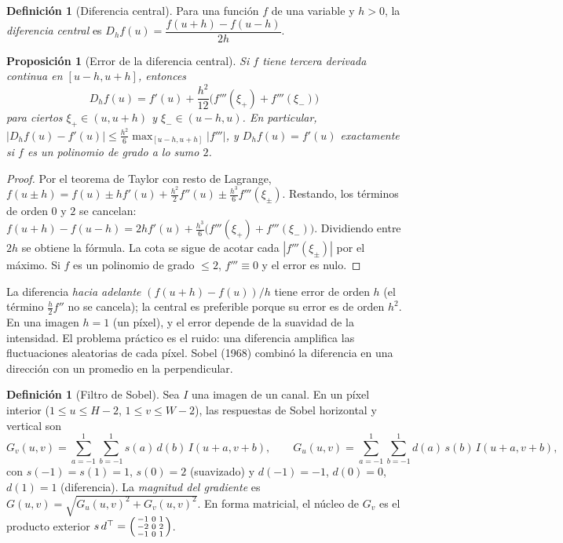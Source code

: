 \documentclass[11pt]{article}
\newtheorem{proposicion}[teorema]{Proposición}
\theoremstyle{definition}
\newtheorem{definicion}[teorema]{Definición}
\theoremstyle{remark}
\newcommand{\abs}[1]{\left\lvert #1\right\rvert}
\begin{document}
\begin{definicion}[Diferencia central]\label{def:dif-central}
\noindent Para una función $f$ de una variable y $h>0$, la \emph{diferencia central} es $D_hf(u)=\dfrac{f(u+h)-f(u-h)}{2h}$.
\end{definicion}

\begin{proposicion}[Error de la diferencia central]\label{prop:dif-central}
\noindent Si $f$ tiene tercera derivada continua en $[u-h,u+h]$, entonces
\[
D_hf(u)=f'(u)+\frac{h^2}{12}\big(f'''(\xi_+)+f'''(\xi_-)\big)
\]
para ciertos $\xi_+\in(u,u+h)$ y $\xi_-\in(u-h,u)$. En particular, $\abs{D_hf(u)-f'(u)}\le\frac{h^2}{6}\max_{[u-h,u+h]}\abs{f'''}$, y $D_hf(u)=f'(u)$ exactamente si $f$ es un polinomio de grado a lo sumo $2$.
\end{proposicion}
\begin{proof}
\noindent Por el teorema de Taylor con resto de Lagrange, $f(u\pm h)=f(u)\pm hf'(u)+\frac{h^2}2f''(u)\pm\frac{h^3}6f'''(\xi_\pm)$. Restando, los términos de orden $0$ y $2$ se cancelan: $f(u+h)-f(u-h)=2hf'(u)+\frac{h^3}{6}\big(f'''(\xi_+)+f'''(\xi_-)\big)$. Dividiendo entre $2h$ se obtiene la fórmula. La cota se sigue de acotar cada $\abs{f'''(\xi_\pm)}$ por el máximo. Si $f$ es un polinomio de grado $\le2$, $f'''\equiv0$ y el error es nulo.
\end{proof}

\noindent La diferencia \emph{hacia adelante} $(f(u+h)-f(u))/h$ tiene error de orden $h$ (el término $\frac h2f''$ no se cancela); la central es preferible porque su error es de orden $h^2$. En una imagen $h=1$ (un píxel), y el error depende de la suavidad de la intensidad. El problema práctico es el ruido: una diferencia amplifica las fluctuaciones aleatorias de cada píxel. Sobel (1968) combinó la diferencia en una dirección con un promedio en la perpendicular.

\begin{definicion}[Filtro de Sobel]\label{def:sobel}
\noindent Sea $I$ una imagen de un canal. En un píxel interior ($1\le u\le H-2$, $1\le v\le W-2$), las respuestas de Sobel horizontal y vertical son
\[
G_v(u,v)=\sum_{a=-1}^{1}\sum_{b=-1}^{1}s(a)\,d(b)\,I(u+a,v+b),\qquad G_u(u,v)=\sum_{a=-1}^{1}\sum_{b=-1}^{1}d(a)\,s(b)\,I(u+a,v+b),
\]
con $s(-1)=s(1)=1$, $s(0)=2$ (suavizado) y $d(-1)=-1$, $d(0)=0$, $d(1)=1$ (diferencia). La \emph{magnitud del gradiente} es $G(u,v)=\sqrt{G_u(u,v)^2+G_v(u,v)^2}$. En forma matricial, el núcleo de $G_v$ es el producto exterior $s\,d^\top=\begin{psmallmatrix}-1&0&1\\-2&0&2\\-1&0&1\end{psmallmatrix}$.
\end{definicion}
\end{document}
